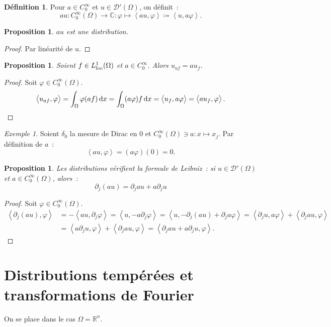 \documentclass{report}
\newcommand{\C}{{\mathbb C}}
\newcommand{\R}{{\mathbb R}}
\newcommand{\scpr}[2]{\left\langle#1, #2\right\rangle}
\newcommand{\loc}{{\text{\textnormal{loc}}}}
\newtheorem{prp}[thm]{Proposition}
\theoremstyle{definition}
\newtheorem{déf}[thm]{Définition}
\theoremstyle{remark}
\newtheorem{ex}{Exemple}[chapter]
\begin{document}
\begin{déf} Pour $a \in C^\infty_0$ et $u \in \mathcal D'(\Omega)$, on définit~:
\[au : C^\infty_0(\Omega) \to \C : \varphi \mapsto \scpr {au}\varphi \coloneqq \scpr u{a\varphi}.\]
\end{déf}

\begin{prp} $au$ est une distribution.
\end{prp}

\begin{proof} Par linéarité de $u$.
\end{proof}

\begin{prp} Soient $f \in L^1_\loc(\Omega)$ et $a \in C^\infty_0$. Alors $u_{af} = au_f$.
\end{prp}

\begin{proof} Soit $\varphi \in C^\infty_0(\Omega)$.
\[\scpr {u_{af}}\varphi = \int_\Omega \varphi (af)\dif x = \int_\Omega(a\varphi)f\dif x = \scpr {u_f}{a\varphi} = \scpr {au_f}\varphi.\]
\end{proof}

\begin{ex} Soient $\delta_0$ la mesure de Dirac en 0 et $C^\infty_0(\Omega) \ni a : x \mapsto x_j$. Par définition de $a$~:
\[\scpr {au}\varphi = (a\varphi)(0) = 0.\]
\end{ex}

\begin{prp} Les distributions vérifient la formule de Leibniz~: si $u \in \mathcal D'(\Omega)$ et $a \in C^\infty_0(\Omega)$, alors~:
\[\partial_j(au) = \partial_jau + a\partial_ju\]
\end{prp}

\begin{proof} Soit $\varphi \in C^\infty_0(\Omega)$.
\begin{align*}
	\scpr {\partial_j(au)}\varphi &= -\scpr {au}{\partial_j\varphi} = \scpr u{-a\partial_j\varphi} = \scpr u{-\partial_j(au)+\partial_ja\varphi}
		= \scpr {\partial_ju}{a\varphi} + \scpr{\partial_jau}\varphi \\
	&= \scpr {a\partial_ju}\varphi + \scpr {\partial_jau}\varphi = \scpr {\partial_jau + a\partial_ju}\varphi.
\end{align*}
\end{proof}

\section{Distributions tempérées et transformations de Fourier}
On se place dans le cas $\Omega = \R^n$.
\end{document}
